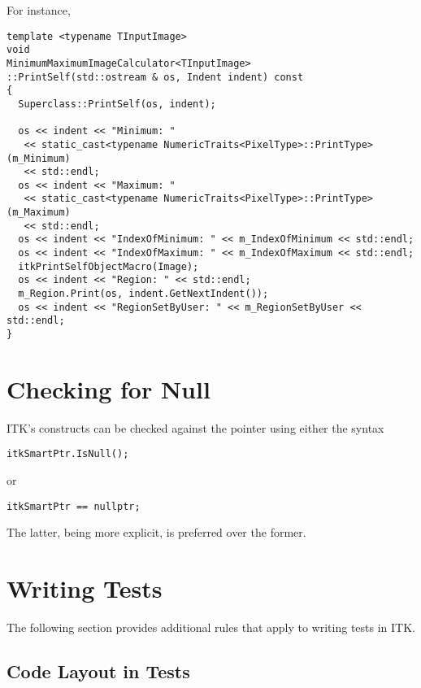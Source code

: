 For instance,

\small
\begin{verbatim}
template <typename TInputImage>
void
MinimumMaximumImageCalculator<TInputImage>
::PrintSelf(std::ostream & os, Indent indent) const
{
  Superclass::PrintSelf(os, indent);

  os << indent << "Minimum: "
   << static_cast<typename NumericTraits<PixelType>::PrintType>(m_Minimum)
   << std::endl;
  os << indent << "Maximum: "
   << static_cast<typename NumericTraits<PixelType>::PrintType>(m_Maximum)
   << std::endl;
  os << indent << "IndexOfMinimum: " << m_IndexOfMinimum << std::endl;
  os << indent << "IndexOfMaximum: " << m_IndexOfMaximum << std::endl;
  itkPrintSelfObjectMacro(Image);
  os << indent << "Region: " << std::endl;
  m_Region.Print(os, indent.GetNextIndent());
  os << indent << "RegionSetByUser: " << m_RegionSetByUser << std::endl;
}
\end{verbatim}
\normalsize


\section{Checking for Null}
\label{sec:CheckingForNull}

ITK's  constructs can be checked against the 
pointer using either the syntax

\small
\begin{verbatim}
itkSmartPtr.IsNull();
\end{verbatim}
\normalsize

or

\small
\begin{verbatim}
itkSmartPtr == nullptr;
\end{verbatim}
\normalsize

The latter, being more explicit, is preferred over the former.

\section{Writing Tests}
\label{sec:WritingTests}

The following section provides additional rules that apply to writing tests
in ITK.


\subsection{Code Layout in Tests}
\label{subsec:CodeLayoutInTests}

